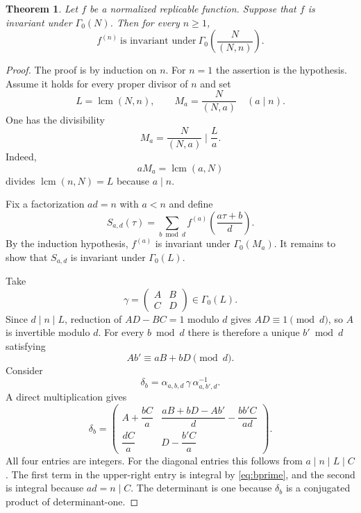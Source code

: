 \documentclass[10pt,a4paper]{amsart}
\newtheorem{thm}{Theorem}
\newcommand{\C}{\mathbb C}
\begin{document}
\begin{thm}\label{thm:congruence-descent}
Let $f$ be a normalized replicable function. Suppose that $f$ is invariant under $\Gamma_0(N)$. Then for every $n\geq1$,
\begin{equation}\label{eq:descent-level}
f^{(n)}\ \text{is invariant under}\ 
\Gamma_0\!\left(\frac{N}{(N,n)}\right).
\end{equation}
\end{thm}

\begin{proof}
The proof is by induction on $n$. For $n=1$ the assertion is the hypothesis. Assume it holds for every proper divisor of $n$ and set
\[
L=\operatorname{lcm}(N,n),
\qquad
M_a=\frac{N}{(N,a)}
\quad(a\mid n).
\]
One has the divisibility
\begin{equation}\label{eq:lcm-divisibility}
M_a=\frac{N}{(N,a)}\mid\frac{L}{a}.
\end{equation}
Indeed,
\[
aM_a=\operatorname{lcm}(a,N)
\]
divides $\operatorname{lcm}(n,N)=L$ because $a\mid n$.

Fix a factorization $ad=n$ with $a<n$ and define
\begin{equation}\label{eq:branch-sum}
S_{a,d}(\tau)=
\sum_{b\bmod d}
 f^{(a)}\!\left(\frac{a\tau+b}{d}\right).
\end{equation}
By the induction hypothesis, $f^{(a)}$ is invariant under $\Gamma_0(M_a)$. It remains to show that $S_{a,d}$ is invariant under $\Gamma_0(L)$.

Take
\[
\gamma=\begin{pmatrix}A&B\\C&D\end{pmatrix}\in\Gamma_0(L).
\]
Since $d\mid n\mid L$, reduction of $AD-BC=1$ modulo $d$ gives $AD\equiv1\pmod d$, so $A$ is invertible modulo $d$. For every $b\bmod d$ there is therefore a unique $b'\bmod d$ satisfying
\begin{equation}\label{eq:bprime}
Ab'\equiv aB+bD\pmod d.
\end{equation}
Consider
\[
\delta_{b}=\alpha_{a,b,d}\,\gamma\,\alpha_{a,b',d}^{-1}.
\]
A direct multiplication gives
\begin{equation}\label{eq:delta-matrix}
\delta_b=
\begin{pmatrix}
A+\dfrac{bC}{a}
&
\dfrac{aB+bD-Ab'}{d}-\dfrac{bb'C}{ad}
\\[3mm]
\dfrac{dC}{a}
&
D-\dfrac{b'C}{a}
\end{pmatrix}.
\end{equation}
All four entries are integers. For the diagonal entries this follows from $a\mid n\mid L\mid C$. The first term in the upper-right entry is integral by \eqref{eq:bprime}, and the second is integral because $ad=n\mid C$. The determinant is one because $\delta_b$ is a conjugated product of determinant-one.


\end{proof}
\end{document}
